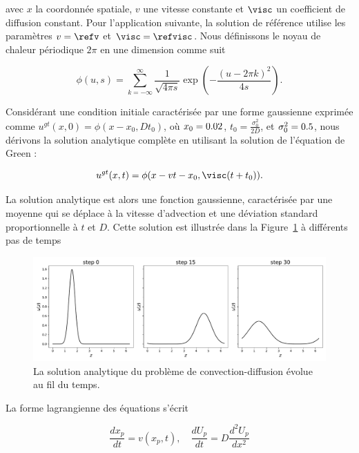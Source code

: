 avec $x$ la coordonnée spatiale, $v$ une vitesse constante et $\visc$ un coefficient de diffusion constant.
Pour l'application suivante, la solution de référence utilise les paramètres $v = \refv$ et $\visc = \refvisc$.
Nous définissons le noyau de chaleur périodique $2\pi$ en une dimension comme suit

\begin{equation*}
    \phi(u, s) = \sum_{k=-\infty}^{\infty} \frac{1}{\sqrt{4 \pi s}} \exp{\left(-\frac{{(u - 2\pi k)}^2}{4s} \right)}.
\end{equation*}

Considérant une condition initiale caractérisée par une forme gaussienne exprimée comme $u^{gt}(x, 0) = \phi(x-x_0, Dt_0)$, où $x_0 = 0.02$, $t_0 = \frac{\sigma_0^2}{2D}$, et $\sigma_0^2 = 0.5$, nous dérivons la solution analytique complète en utilisant la solution de l'équation de Green :

\begin{equation*}
    u^{gt}(x, t) = \phi(x- v t - x_0, \visc (t+t_0)).
\end{equation*}

La solution analytique est alors une fonction gaussienne, caractérisée par une moyenne qui se déplace à la vitesse d'advection et une déviation standard proportionnelle à $t$ et $D$. Cette solution est illustrée dans la Figure~\ref{fig:1d_analytical} à différents pas de temps

\begin{figure}[ht]
    \centering
    \includegraphics[width=\linewidth]{images/app1d/analytical_frame.pdf}
    \caption{La solution analytique du problème de convection-diffusion évolue au fil du temps.}
    \label{fig:1d_analytical}
\end{figure}

La forme lagrangienne des équations s'écrit

\begin{equation*}
    \frac{dx_p}{dt} = v(x_p, t), \quad \frac{dU_p}{dt} = D \frac{d^2 U_p}{dx^2}
\end{equation*}

